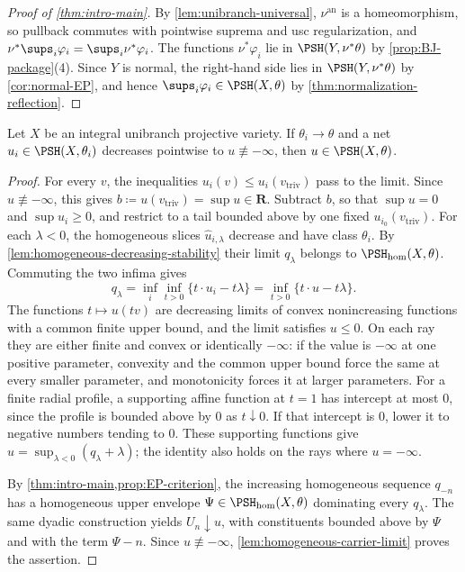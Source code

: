 \documentclass[11pt,a4paper]{article}
\newcommand{\an}{\mathrm{an}}          %
\newcommand{\vtriv}{v_{\mathrm{triv}}} %
\newcommand{\PSHhom}{\PSH_{\mathrm{hom}}}          %
\begin{document}
\begin{proof}[Proof of \cref{thm:intro-main}]
By \cref{lem:unibranch-universal}, $\nu^{\an}$ is a homeomorphism, so pullback commutes with pointwise suprema and usc regularization, and $\nu^*\sups_i\varphi_i=\sups_i\nu^*\varphi_i$. The functions $\nu^*\varphi_i$ lie in $\PSH(Y,\nu^*\theta)$ by \cref{prop:BJ-package}(4). Since $Y$ is normal, the right-hand side lies in $\PSH(Y,\nu^*\theta)$ by \cref{cor:normal-EP}, and hence $\sups_i\varphi_i\in\PSH(X,\theta)$ by \cref{thm:normalization-reflection}.
\end{proof}

\begin{corollary}\label{cor:unibranch-decreasing-stability}
Let $X$ be an integral unibranch projective variety. If $\theta_i\to\theta$ and a net $u_i\in\PSH(X,\theta_i)$ decreases pointwise to $u\not\equiv-\infty$, then $u\in\PSH(X,\theta)$.
\end{corollary}

\begin{proof}
For every $v$, the inequalities $u_i(v)\le u_i(\vtriv)$ pass to the limit. Since $u\not\equiv-\infty$, this gives $b\coloneqq u(\vtriv)=\sup u\in\mathbf R$. Subtract $b$, so that $\sup u=0$ and $\sup u_i\ge0$, and restrict to a tail bounded above by one fixed $u_{i_0}(\vtriv)$. For each $\lambda<0$, the homogeneous slices $\widehat u_{i,\lambda}$ decrease and have class $\theta_i$. By \cref{lem:homogeneous-decreasing-stability} their limit $q_\lambda$ belongs to $\PSHhom(X,\theta)$. Commuting the two infima gives
\[
 q_\lambda=\inf_i\inf_{t>0}\{t\mathbin\cdot u_i-t\lambda\}
 =\inf_{t>0}\{t\mathbin\cdot u-t\lambda\}.
\]
The functions $t\mapsto u(tv)$ are decreasing limits of convex nonincreasing functions with a common finite upper bound, and the limit satisfies $u\le0$. On each ray they are either finite and convex or identically $-\infty$: if the value is $-\infty$ at one positive parameter, convexity and the common upper bound force the same at every smaller parameter, and monotonicity forces it at larger parameters. For a finite radial profile, a supporting affine function at $t=1$ has intercept at most $0$, since the profile is bounded above by $0$ as $t\downarrow0$. If that intercept is $0$, lower it to negative numbers tending to $0$. These supporting functions give $u=\sup_{\lambda<0}(q_\lambda+\lambda)$; the identity also holds on the rays where $u=-\infty$.

By \cref{thm:intro-main,prop:EP-criterion}, the increasing homogeneous sequence $q_{-n}$ has a homogeneous upper envelope $\Psi\in\PSHhom(X,\theta)$ dominating every $q_\lambda$. The same dyadic construction yields $U_n\downarrow u$, with constituents bounded above by $\Psi$ and with the term $\Psi-n$. Since $u\not\equiv-\infty$, \cref{lem:homogeneous-carrier-limit} proves the assertion.
\end{proof}
\end{document}
